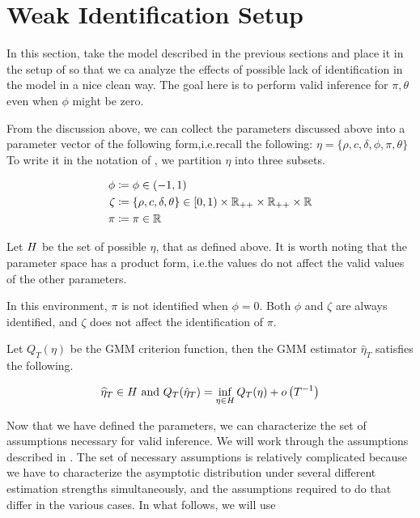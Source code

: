 \documentclass[11pt, letterpaper, twoside, final]{article}
\begin{document}





\section{Weak Identification Setup}

In this section, take the model described in the previous sections and place it in the setup of
\textcite{andrews2014Gmm} so that we ca analyze the effects of possible lack of identification in the model in a
nice clean way.
The goal here is to perform valid inference for $\pi, \theta$ even when $\phi$ might be zero. 


From the discussion above, we can collect the parameters discussed above into a parameter vector of the following
form,i.e.\@ recall the following: $\eta = \lbrace \rho, c, \delta, \phi, \pi, \theta \rbrace$
To write it in the notation of \textcite{andrews2014Gmm}, we partition $\eta$ into three subsets.

\begin{align}
    \phi &\coloneqq \phi  \in (-1, 1) \\ 
    \zeta &\coloneqq \lbrace \rho, c, \delta, \theta \rbrace \in [0,1) \times \mathbb{R}_{++} \times \mathbb{R}_{++} \times
    \mathbb{R}  \\
    \pi &\coloneqq \pi \in \mathbb{R} 
\end{align}

Let $H$ be the set of possible $\eta$, that as defined above.
It is worth noting that the parameter space has a product form, i.e.\@ the values do not affect the valid values
of the other parameters.

In this environment, $\pi$ is not identified when $\phi = 0$.
Both $\phi$ and $\zeta$ are always identified, and $\zeta$ does not affect the identification of $\pi$.

Let $Q_T(\eta)$ be the GMM criterion function, then the GMM estimator $\hat{\eta}_T$ satisfies the following.


\begin{equation}
    \widehat{\eta}_T \in \Eta\ \text{and}\ Q_T(\hat{\eta}_T) = \inf_{\eta \in \Eta} Q_T(\eta) +
    o\left(T^{-1}\right) 
\end{equation}


Now that we have defined the parameters, we can characterize the set of assumptions necessary for valid inference.
We will work through the assumptions described in \textcite{andrews2014Gmm}.
The set of necessary assumptions is relatively complicated because we have to characterize the asymptotic
distribution under several different estimation strengths simultaneously, and the assumptions required to do that
  differ in the various cases. 
In what follows, we will use 
\end{document}
